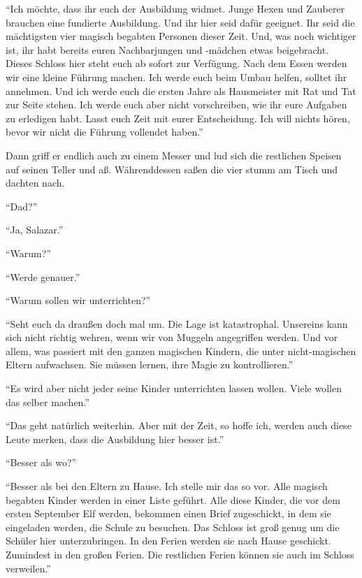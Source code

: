 \enquote{Ich möchte, dass ihr euch der Ausbildung widmet. Junge Hexen und Zauberer brauchen eine fundierte Ausbildung. Und ihr hier seid dafür geeignet. Ihr seid die mächtigsten vier magisch begabten Personen dieser Zeit. Und, was noch wichtiger ist, ihr habt bereits euren Nachbarjungen und -mädchen etwas beigebracht. Dieses Schloss hier steht euch ab sofort zur Verfügung. \gst Nach dem Essen werden wir eine kleine Führung machen. Ich werde euch beim Umbau helfen, solltet ihr annehmen. Und ich werde euch die ersten Jahre als Hausmeister mit Rat und Tat zur Seite stehen. Ich werde euch aber nicht vorschreiben, wie ihr eure Aufgaben zu erledigen habt. \gst Lasst euch Zeit mit eurer Entscheidung. Ich will nichts hören, bevor wir nicht die Führung vollendet haben.}

Dann griff er endlich auch zu einem Messer und lud sich die restlichen Speisen auf seinen Teller und aß. Währenddessen saßen die vier stumm am Tisch und dachten nach.

\enquote{Dad?}

\enquote{Ja, Salazar.}

\enquote{Warum?}

\enquote{Werde genauer.}

\enquote{Warum sollen wir unterrichten?}

\enquote{Seht euch da draußen doch mal um. Die Lage ist katastrophal. Unsereins kann sich nicht richtig wehren, wenn wir von Muggeln angegriffen werden. Und vor allem, was passiert mit den ganzen magischen Kindern, die unter nicht-magischen Eltern aufwachsen. Sie müssen lernen, ihre Magie zu kontrollieren.}

\enquote{Es wird aber nicht jeder seine Kinder unterrichten lassen wollen. Viele wollen das selber machen.}

\enquote{Das geht natürlich weiterhin. Aber mit der Zeit, so hoffe ich, werden auch diese Leute merken, dass die Ausbildung hier besser ist.}

\enquote{Besser als wo?}

\enquote{Besser als bei den Eltern zu Hause. \gst Ich stelle mir das so vor. Alle magisch begabten Kinder werden in einer Liste geführt. Alle diese Kinder, die vor dem ersten September Elf werden, bekommen einen Brief zugeschickt, in dem sie eingeladen werden, die Schule zu besuchen. Das Schloss ist groß genug um die Schüler hier unterzubringen. In den Ferien werden sie nach Hause geschickt. Zumindest in den großen Ferien. Die restlichen Ferien können sie auch im Schloss verweilen.}

